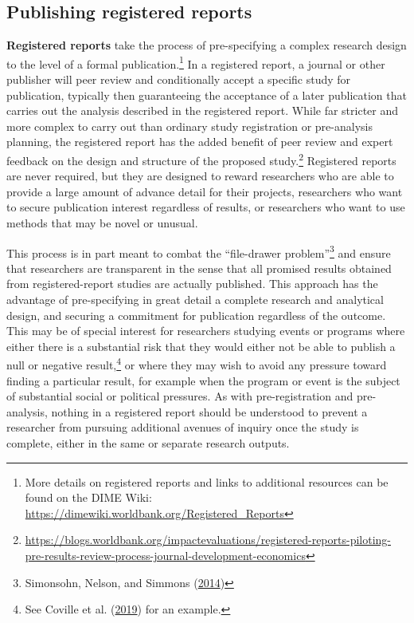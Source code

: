 \documentclass[
]{book}
\begin{document}
\hypertarget{publishing-registered-reports}{%
\subsection*{Publishing registered reports}\label{publishing-registered-reports}}

\textbf{Registered reports} take the process of pre-specifying a complex research design
to the level of a formal publication.\footnote{More details on registered reports and
  links to additional resources can be found on the DIME Wiki:
  \url{https://dimewiki.worldbank.org/Registered_Reports}}
In a registered report, a journal or other publisher
will peer review and conditionally accept a specific study for publication,
typically then guaranteeing the acceptance of a later publication
that carries out the analysis described in the registered report.
While far stricter and more complex to carry out than
ordinary study registration or pre-analysis planning,
the registered report has the added benefit
of peer review and expert feedback
on the design and structure of the proposed study.\footnote{\url{https://blogs.worldbank.org/impactevaluations/registered-reports-piloting-pre-results-review-process-journal-development-economics}}
Registered reports are never required,
but they are designed to reward researchers
who are able to provide a large amount of advance detail for their projects,
researchers who want to secure publication interest regardless of results,
or researchers who want to use methods that may be novel or unusual.

This process is in part meant to combat the ``file-drawer problem''\footnote{Simonsohn, Nelson, and Simmons (\protect\hyperlink{ref-simonsohn2014p}{2014})}
and ensure that researchers are transparent in the sense that
all promised results obtained from registered-report studies are actually published.
This approach has the advantage of pre-specifying in great detail
a complete research and analytical design,
and securing a commitment for publication regardless of the outcome.
This may be of special interest for researchers
studying events or programs where either there is a substantial risk
that they would either not be able to publish a null or negative result,\footnote{See Coville et al. (\protect\hyperlink{ref-coville2019nollywood}{2019}) for an example.}
or where they may wish to avoid any pressure toward finding a particular result,
for example when the program or event is the subject of substantial social or political pressures.
As with pre-registration and pre-analysis,
nothing in a registered report should be understood
to prevent a researcher from pursuing additional avenues of inquiry
once the study is complete, either in the same or separate research outputs.
\end{document}
